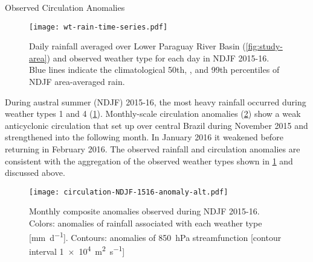 \begin{block}{Observed Circulation Anomalies}
  \begin{mdframed}
  \begin{figure}
    \caption{
  		Daily rainfall averaged over Lower Paraguay River Basin (\cref{fig:study-area}) and observed weather type for each day in NDJF 2015-16.
      Blue lines indicate the climatological 50th, , and 99th percentiles of NDJF area-averaged rain.
      \label{fig:rain-wt}
  	}
    \noindent\texttt{[image: wt-rain-time-series.pdf]}
    \end{figure}
  \end{mdframed}

  During austral summer (NDJF) 2015-16, the most heavy rainfall occurred during weather types 1 and 4 (\cref{fig:rain-wt}).
  Monthly-scale circulation anomalies (\cref{fig:anomalies}) show a weak anticyclonic circulation that set up over central Brazil during November 2015 and strengthened into the following month.
  In January 2016 it weakened before returning in February 2016.
  The observed rainfall and circulation anomalies are consistent with the aggregation of the observed weather types shown in \cref{fig:rain-wt} and discussed above.

  \begin{mdframed}
  \begin{figure}
  	\noindent\texttt{[image: circulation-NDJF-1516-anomaly-alt.pdf]}
  	\caption{
      	Monthly composite anomalies observed during NDJF 2015-16.
        Colors: anomalies of rainfall associated with each weather type [\si{\milli\meter\per\day}].
        Contours: anomalies of \SI{850}{\hecto\pascal} streamfunction [contour interval \SI{1e4}{\meter\squared\per\second}]
        \label{fig:anomalies}
  	}
  \end{figure}
  \end{mdframed}
\end{block}
